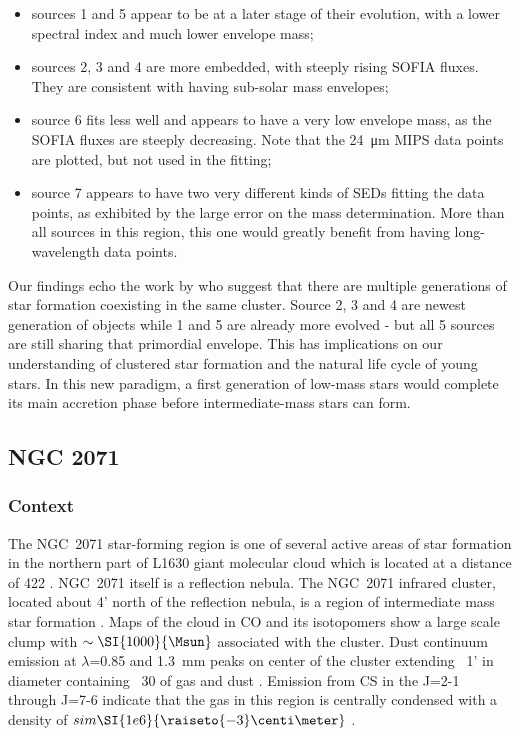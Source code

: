 \begin{itemize}
\item sources 1 and 5 appear to be at a later stage of their evolution, with a lower spectral index and much lower envelope mass;
\item sources 2, 3 and 4 are more embedded, with steeply rising SOFIA fluxes. They are consistent with having sub-solar mass envelopes;
\item source 6 fits less well and appears to have a very low envelope mass, as the SOFIA fluxes are steeply decreasing. Note that the \SI{24}{\um} MIPS data points are plotted, but not used in the fitting;
\item source 7 appears to have two very different kinds of SEDs fitting the data points, as exhibited by the large error on the mass determination. More than all sources in this region, this one would greatly benefit from having long-wavelength data points.
\end{itemize}

Our findings echo the work by \citet{Beltran:2008gu}  who suggest that there are multiple generations of star formation coexisting in the same cluster. Source 2, 3 and 4 are newest generation of objects while 1 and 5 are already more evolved - but all 5 sources are still sharing that primordial envelope. This has implications on our understanding of clustered star formation and the natural life cycle of young stars. In this new paradigm, a first generation of low-mass stars would complete its main accretion phase before intermediate-mass stars can form. %



\subsection{NGC 2071}

\subsubsection{Context}
The NGC~2071 star-forming region is one of several active areas of star formation in the northern part of L1630 giant molecular cloud which is located at a distance of \SI{422}{\pc} \citep{vanDishoeck:2011em}. NGC~2071 itself is a reflection nebula.
The NGC~2071 infrared cluster, located about 4' north of the reflection nebula, is a region of intermediate mass star formation \citep{Strom1976, Persson1981, Butner1990}. Maps of the cloud in CO and its isotopomers \citep{Buckle2010} show a large scale clump with $\sim\SI{1000}{\Msun}$ associated with the cluster. Dust continuum emission at $\lambda$=0.85 and \SI{1.3}{\milli\meter} peaks on center of the cluster extending ~1' in diameter containing ~\SI{30}{\Msun} of gas and dust \citep{Johnstone2001,Mitchell2001,Launhardt1996}. Emission from CS in the J=2-1 through J=7-6 indicate that the gas in this region is centrally condensed with a density of $sim\SI{1e6}{\raiseto{-3}\centi\meter}$ \citep{Zhou1990}. 

